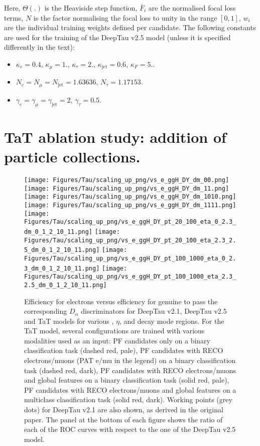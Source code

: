 Here, $\Theta(.)$ is the Heaviside step function, $\bar{F}_i$ are the normalised focal loss terms, $N$ is the factor normalising the focal loss to unity in the range $[0,1]$, $w_i$ are the individual training weights defined per \tauh candidate. The following constants are used for the training of the DeepTau v2.5 model (unless it is specified differently in the text):
\begin{itemize}
    \item $\kappa_e = 0.4$, $\kappa_\mu = 1.$, $\kappa_\tau = 2.$, $\kappa_\text{jet} = 0.6$, $\kappa_F = 5.$.
    \item $N_e = N_\mu = N_\text{jet} = 1.63636$, $N_\tau = 1.17153$.
    \item $\gamma_e = \gamma_\mu = \gamma_\text{jet} = 2$, $\gamma_\tau = 0.5$.
\end{itemize}



\newpage
\section{TaT ablation study: addition of particle collections.}\label{app:tat-add}

\begin{figure}[H]
    \centering
    \texttt{[image: Figures/Tau/scaling\_up\_png/vs\_e\_ggH\_DY\_dm\_00.png]}
    \texttt{[image: Figures/Tau/scaling\_up\_png/vs\_e\_ggH\_DY\_dm\_11.png]}
    \texttt{[image: Figures/Tau/scaling\_up\_png/vs\_e\_ggH\_DY\_dm\_1010.png]}
    \texttt{[image: Figures/Tau/scaling\_up\_png/vs\_e\_ggH\_DY\_dm\_1111.png]}
    \texttt{[image: Figures/Tau/scaling\_up\_png/vs\_e\_ggH\_DY\_pt\_20\_100\_eta\_0\_2.3\_dm\_0\_1\_2\_10\_11.png]}
    \texttt{[image: Figures/Tau/scaling\_up\_png/vs\_e\_ggH\_DY\_pt\_20\_100\_eta\_2.3\_2.5\_dm\_0\_1\_2\_10\_11.png]}
    \texttt{[image: Figures/Tau/scaling\_up\_png/vs\_e\_ggH\_DY\_pt\_100\_1000\_eta\_0\_2.3\_dm\_0\_1\_2\_10\_11.png]}
    \texttt{[image: Figures/Tau/scaling\_up\_png/vs\_e\_ggH\_DY\_pt\_100\_1000\_eta\_2.3\_2.5\_dm\_0\_1\_2\_10\_11.png]}
    \caption{Efficiency for electrons versus efficiency for genuine \tauh to pass the corresponding $D_\alpha$ discriminators for DeepTau v2.1, DeepTau v2.5 and TaT models for various \pt, $\eta$, and \tauh decay mode regions. For the TaT model, several configurations are trained with various modalities used as an input: PF candidates only on a binary classification task (dashed red, pale), PF candidates with RECO electrons/muons (PAT e/mu in the legend) on a binary classification task (dashed red, dark), PF candidates with RECO electrons/muons and global features on a binary classification task (solid red, pale), PF candidates with RECO electrons/muons and global features on a multiclass classification task (solid red, dark). Working points (grey dots) for DeepTau v2.1 are also shown, as derived in the original paper. The panel at the bottom of each figure shows the ratio of each of the ROC curves with respect to the one of the DeepTau v2.5 model.}
\end{figure}

